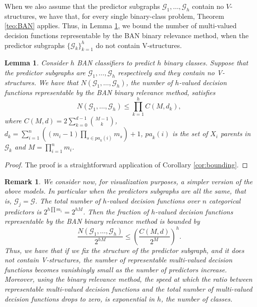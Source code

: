 \documentclass[11pt,a4paper, twoside]{book}
\newtheorem{lemma}{Lemma}[chapter]
\newtheorem{remark}{Remark}[chapter]
\begin{document}
When we also assume that the predictor subgraphs $\mathcal{G}_1,\ldots,\mathcal{G}_h$ contain no $V$-structures, we have that, for every single binary-class problem, Theorem \ref{teo:BAN} applies.
Thus, in Lemma \ref{lem:brbound}, we bound the number of multi-valued decision functions representable by the BAN binary relevance method, when the predictor subgraphs $\{\mathcal{G}_k\}_{k=1}^h$ do not contain V-structures.

\begin{lemma}
\label{lem:brbound}
Consider $h$ BAN classifiers to predict $h$ binary classes. Suppose that the predictor subgraphs are  $\mathcal{G}_1,\ldots,\mathcal{G}_h$ respectively and they contain no V-structures. We have that $N\left(\mathcal{G}_1,\ldots,\mathcal{G}_h\right)$, the number of $h$-valued decision functions representable by the BAN binary relevance method, satisfies
\[ N\left(\mathcal{G}_1,\ldots,\mathcal{G}_h\right) \leq \prod_{k=1}^{h} C(M,d_k), \]
where $C(M,d)=2\sum_{k=0}^{d-1}{M-1 \choose k }$, $d_k=\sum_{i=1}^n \left( (m_i-1)\prod_{s \in {pa}_k(i)} m_s \right)+1$, ${pa}_k(i)$ is the set of $X_i$ parents in $\mathcal{G}_k$ and $M=\prod_{i=1}^n m_i$.
\end{lemma}
\begin{proof}
The proof  is a straightforward application of Corollary \ref{cor:bounding}. 
\end{proof}

\begin{remark}
We consider now, for visualization purposes, a simpler version of the above models. In particular when the predictors subgraphs are all the same, that is, $\mathcal{G}_j=\mathcal{G}$.  
The total number of $h$-valued decision functions over $n$ categorical predictors is $2^{h \prod m_i}=2^{h M}$. Then the fraction of $h$-valued decision functions representable by the BAN binary relevance method is bounded by
\[ \frac{N\left(\mathcal{G}_1,\ldots,\mathcal{G}_h\right)}{2^{h M}}\leq \left( \frac{C(M,d)}{2^M} \right)^{h} .\]
Thus, we have that if we fix the structure of the predictor subgraph, and it does not contain V-structures, the number of representable multi-valued decision functions becomes vanishingly small as the number of predictors increase. Moreover, using the binary relevance method, the \textit{speed} at which the ratio between representable multi-valued decision functions and the total number of multi-valued decision functions drops to zero, is exponential in $h$, the number of classes.
\end{remark}
\end{document}
